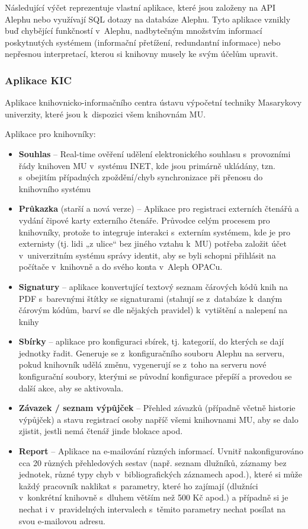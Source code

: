 \documentclass[
	11pt, oneside, printed, final, palatino, monochrome
	microtype,
	table,   %
	lof,     %
	lot     %
]{fithesis3}
\newcommand{\bold}[1]{\textbf{#1}}
\begin{document}
{Následující výčet reprezentuje vlastní aplikace, které jsou založeny na API Alephu nebo využívají SQL dotazy na databáze Alephu. Tyto aplikace vznikly buď chybějící funkčností v~Alephu, nadbytečným množstvím informací poskytnutých systémem (informační přetížení, redundantní informace) nebo nepřesnou interpretací, kterou si knihovny musely ke svým účelům upravit.

\subsubsection{Aplikace KIC}
Aplikace knihovnicko-informačního centra ústavu výpočetní techniky Masarykovy univerzity, které jsou k~dispozici všem knihovnám MU.

Aplikace pro knihovníky:

\begin{itemize}
\item \bold{Souhlas} – Real-time ověření udělení elektronického souhlasu s~provozními řády knihoven MU v~systému INET, kde jsou primárně ukládány, tzn. s~obejitím případných zpoždění/chyb synchronizace při přenosu do knihovního systému
\item \bold{Průkazka} (starší a nová verze) – Aplikace pro registraci externích čtenářů a vydání čipové karty externího čtenáře. Průvodce celým procesem pro knihovníky, protože to integruje interakci s~externím systémem, kde je pro externisty (tj. lidi „z ulice“ bez jiného vztahu k~MU) potřeba založit účet v~univerzitním systému správy identit, aby se byli schopni přihlásit na počítače v~knihovně a do svého konta v~Aleph OPACu.
\item \bold{Signatury} – aplikace konvertující textový seznam čárových kódů knih na PDF s~barevnými štítky se signaturami (stahují se z~databáze k~daným čárovým kódům, barví se dle nějakých pravidel) k~vytištění a nalepení na knihy
\item \bold{Sbírky} – aplikace pro konfiguraci sbírek, tj. kategorií, do kterých se dají jednotky řadit. Generuje se z~konfiguračního souboru Alephu na serveru, pokud knihovník udělá změnu, vygenerují se z~toho na serveru nové konfigurační soubory, kterými se původní konfigurace přepíší a provedou se další akce, aby se aktivovala.
\item \bold{Závazek / seznam výpůjček} – Přehled závazků (případně včetně historie výpůjček) a stavu registrací osoby napříč všemi knihovnami MU, aby se dalo zjistit, jestli nemá čtenář jinde blokace apod.
\item \bold{Report} – Aplikace na e-mailování různých informací. Uvnitř nakonfigurováno cca 20 různých přehledových sestav (např. seznam dlužníků, záznamy bez jednotek, různé typy chyb v~bibliografických záznamech apod.), které si může každý pracovník naklikat s~parametry, které ho zajímají (dlužníci v~konkrétní knihovně s~dluhem větším než 500 Kč apod.) a případně si je nechat i v~pravidelných intervalech s~těmito parametry nechat posílat na svou e-mailovou adresu.

\end{itemize}}
\end{document}

